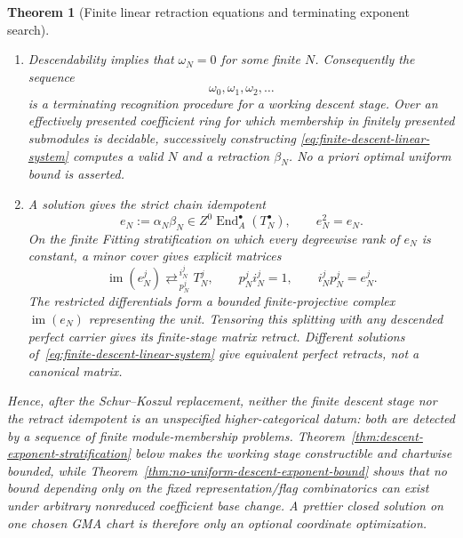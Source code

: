 \documentclass[11pt]{article}
\newtheorem{theorem}{Theorem}[section]
\theoremstyle{definition}
\begin{document}
\begin{theorem}[Finite linear retraction equations and terminating exponent search]
\begin{enumerate}[label=\textnormal{(\roman*)}]
\item Descendability implies that $\omega_N=0$ for some finite $N$.
Consequently the sequence
\[
 \omega_0,\omega_1,\omega_2,\ldots
\]
is a terminating recognition procedure for a working descent stage.  Over
an effectively presented coefficient ring for which membership in finitely
presented submodules is decidable, successively constructing
\eqref{eq:finite-descent-linear-system} computes a valid $N$ and a retraction
$\beta_N$.  No a priori optimal uniform bound is asserted.

\item A solution gives the strict chain idempotent
\begin{equation}\label{eq:explicit-descent-idempotent}
 e_N:=\alpha_N\beta_N\in
 Z^0\operatorname{End}_A^\bullet(T_N^\bullet),
 \qquad e_N^2=e_N.
\end{equation}
On the finite Fitting stratification on which every degreewise rank of $e_N$
is constant, a minor cover gives explicit matrices
\[
 \operatorname{im}(e_N^j)
 \mathop{\rightleftarrows}^{\,i_N^j}_{\,p_N^j}
 T_N^j,
 \qquad p_N^ji_N^j=1,
 \qquad i_N^jp_N^j=e_N^j.
\]
The restricted differentials form a bounded finite-projective complex
$\operatorname{im}(e_N)$ representing the unit.  Tensoring this splitting
with any descended perfect carrier gives its finite-stage matrix retract.
Different solutions of~\eqref{eq:finite-descent-linear-system} give equivalent
perfect retracts, not a canonical matrix.
\end{enumerate}

Hence, after the Schur--Koszul replacement, neither the finite descent stage nor the retract idempotent is an unspecified higher-categorical datum: both are detected by a sequence of finite module-membership problems.  Theorem~\ref{thm:descent-exponent-stratification} below makes the working stage constructible and chartwise bounded, while Theorem~\ref{thm:no-uniform-descent-exponent-bound} shows that no bound depending only on the fixed representation/flag combinatorics can exist under arbitrary nonreduced coefficient base change.  A prettier closed solution on one chosen GMA chart is therefore only an optional coordinate optimization.
\end{theorem}
\end{document}
